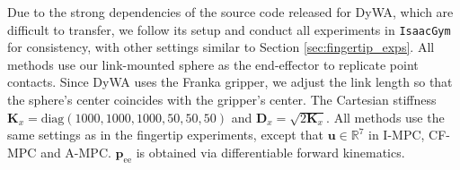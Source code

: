 Due to the strong dependencies of the source code released for DyWA, which are difficult to transfer, we follow its setup and conduct all experiments in \texttt{IsaacGym} for consistency, with other settings similar to Section \ref{sec:fingertip_exps}. All methods use our link-mounted sphere as the end-effector to replicate point contacts. Since DyWA uses the Franka gripper, we adjust the link length so that the sphere’s center coincides with the gripper’s center. The Cartesian stiffness $\boldsymbol{K}_x=\text{diag}(1000,1000,1000,50,50,50)$ and $\boldsymbol{D}_x=\sqrt{2\boldsymbol{K}_x}$. All methods use the same settings as in the fingertip experiments, except that $\boldsymbol{u} \in \mathbb{R}^7$ in I-MPC, CF-MPC and A-MPC. $\boldsymbol{p}_{\text{ee}}$ is obtained via differentiable forward kinematics.



